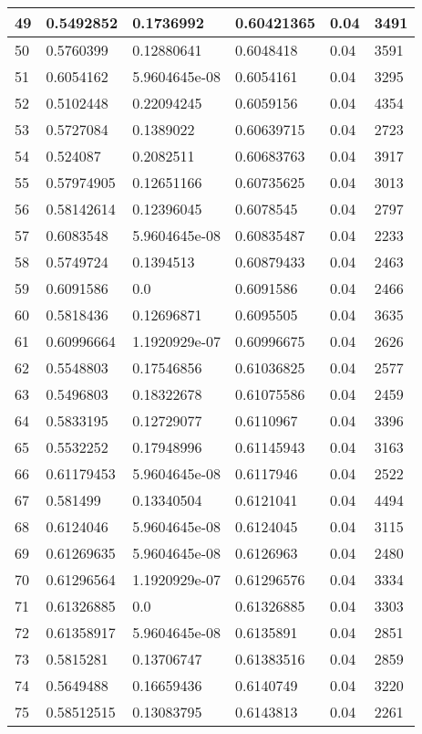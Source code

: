 \begin{longtable}{|l|l|l|l|l|l|}
49 & 0.5492852 & 0.1736992 & 0.60421365 & 0.04 & 3491 \\ \hline 
50 & 0.5760399 & 0.12880641 & 0.6048418 & 0.04 & 3591 \\ \hline 
51 & 0.6054162 & 5.9604645e-08 & 0.6054161 & 0.04 & 3295 \\ \hline 
52 & 0.5102448 & 0.22094245 & 0.6059156 & 0.04 & 4354 \\ \hline 
53 & 0.5727084 & 0.1389022 & 0.60639715 & 0.04 & 2723 \\ \hline 
54 & 0.524087 & 0.2082511 & 0.60683763 & 0.04 & 3917 \\ \hline 
55 & 0.57974905 & 0.12651166 & 0.60735625 & 0.04 & 3013 \\ \hline 
56 & 0.58142614 & 0.12396045 & 0.6078545 & 0.04 & 2797 \\ \hline 
57 & 0.6083548 & 5.9604645e-08 & 0.60835487 & 0.04 & 2233 \\ \hline 
58 & 0.5749724 & 0.1394513 & 0.60879433 & 0.04 & 2463 \\ \hline 
59 & 0.6091586 & 0.0 & 0.6091586 & 0.04 & 2466 \\ \hline 
60 & 0.5818436 & 0.12696871 & 0.6095505 & 0.04 & 3635 \\ \hline 
61 & 0.60996664 & 1.1920929e-07 & 0.60996675 & 0.04 & 2626 \\ \hline 
62 & 0.5548803 & 0.17546856 & 0.61036825 & 0.04 & 2577 \\ \hline 
63 & 0.5496803 & 0.18322678 & 0.61075586 & 0.04 & 2459 \\ \hline 
64 & 0.5833195 & 0.12729077 & 0.6110967 & 0.04 & 3396 \\ \hline 
65 & 0.5532252 & 0.17948996 & 0.61145943 & 0.04 & 3163 \\ \hline 
66 & 0.61179453 & 5.9604645e-08 & 0.6117946 & 0.04 & 2522 \\ \hline 
67 & 0.581499 & 0.13340504 & 0.6121041 & 0.04 & 4494 \\ \hline 
68 & 0.6124046 & 5.9604645e-08 & 0.6124045 & 0.04 & 3115 \\ \hline 
69 & 0.61269635 & 5.9604645e-08 & 0.6126963 & 0.04 & 2480 \\ \hline 
70 & 0.61296564 & 1.1920929e-07 & 0.61296576 & 0.04 & 3334 \\ \hline 
71 & 0.61326885 & 0.0 & 0.61326885 & 0.04 & 3303 \\ \hline 
72 & 0.61358917 & 5.9604645e-08 & 0.6135891 & 0.04 & 2851 \\ \hline 
73 & 0.5815281 & 0.13706747 & 0.61383516 & 0.04 & 2859 \\ \hline 
74 & 0.5649488 & 0.16659436 & 0.6140749 & 0.04 & 3220 \\ \hline 
75 & 0.58512515 & 0.13083795 & 0.6143813 & 0.04 & 2261 \\ \hline 
\end{longtable}